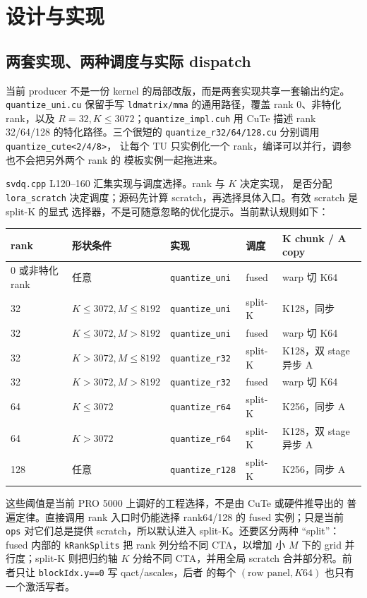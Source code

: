 \section{设计与实现}

\subsection{两套实现、两种调度与实际 dispatch}\label{sec:39-structure}

当前 producer 不是一份 kernel 的局部改版，而是两套实现共享一套输出约定。
\texttt{quantize\_uni.cu} 保留手写 \texttt{ldmatrix/mma} 的通用路径，覆盖
rank 0、非特化 rank，以及 $R=32,K\le3072$；\texttt{quantize\_impl.cuh}
用 CuTe 描述 rank 32/64/128 的特化路径。三个很短的
\texttt{quantize\_r32/64/128.cu} 分别调用 \texttt{quantize\_cute<2/4/8>}，
让每个 TU 只实例化一个 rank，编译可以并行，调参也不会把另外两个 rank 的
模板实例一起拖进来。

\texttt{svdq.cpp} L120--160 汇集实现与调度选择。rank 与 $K$ 决定实现，
是否分配 \texttt{lora\_scratch} 决定调度；源码先计算 scratch，再选择具体入口。有效 scratch 是 split-K 的显式
选择器，不是可随意忽略的优化提示。当前默认规则如下：

\begin{center}\small
\begin{tabular}{@{}lllll@{}}
\toprule
rank & 形状条件 & 实现 & 调度 & K chunk / A copy \\
\midrule
0 或非特化 rank & 任意 & \texttt{quantize\_uni} & fused & warp 切 K64 \\
32 & $K\le3072,M\le8192$ & \texttt{quantize\_uni} & split-K & K128，同步 \\
32 & $K\le3072,M>8192$ & \texttt{quantize\_uni} & fused & warp 切 K64 \\
32 & $K>3072,M\le8192$ & \texttt{quantize\_r32} & split-K & K128，双 stage 异步 A \\
32 & $K>3072,M>8192$ & \texttt{quantize\_r32} & fused & warp 切 K64 \\
64 & $K\le3072$ & \texttt{quantize\_r64} & split-K & K256，同步 A \\
64 & $K>3072$ & \texttt{quantize\_r64} & split-K & K128，双 stage 异步 A \\
128 & 任意 & \texttt{quantize\_r128} & split-K & K256，同步 A \\
\bottomrule
\end{tabular}
\end{center}

这些阈值是当前 PRO 5000 上调好的工程选择，不是由 CuTe 或硬件推导出的
普遍定律。直接调用 rank 入口时仍能选择 rank64/128 的 fused 实例；只是当前
\texttt{ops} 对它们总是提供 scratch，所以默认进入 split-K。还要区分两种
“split”：fused 内部的 \texttt{kRankSplits} 把 rank 列分给不同 CTA，以增加
小 $M$ 下的 grid 并行度；split-K 则把归约轴 $K$ 分给不同 CTA，并用全局
scratch 合并部分积。前者只让 \texttt{blockIdx.y==0} 写 qact/ascales，后者
的每个 $(\text{row panel},K64)$ 也只有一个激活写者。

